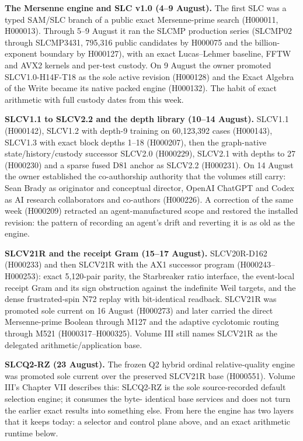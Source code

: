 \textbf{The Mersenne engine and SLC v1.0 (4--9 August).} The first SLC was a typed SAM/SLC branch of a public exact Mersenne-prime search (H000011,
H000013). Through 5--9 August it ran the SLCMP production series (SLCMP02 through SLCMP3431, 795,316 public candidates by H000075 and the
billion-exponent boundary by H000127), with an exact Lucas--Lehmer baseline, FFTW and AVX2 kernels and per-test custody. On 9 August the owner
promoted SLCV1.0-H14F-T18 as the sole active revision (H000128) and the Exact Algebra of the Write became its native packed engine (H000132).
The habit of exact arithmetic with full custody dates from this week.

\textbf{SLCV1.1 to SLCV2.2 and the depth library (10--14 August).} SLCV1.1 (H000142), SLCV1.2 with depth-9 training on 60,123,392 cases (H000143),
SLCV1.3 with exact block depths 1--18 (H000207), then the graph-native state/history/custody successor SLCV2.0 (H000229), SLCV2.1 with depths
to 27 (H000230) and a sparse fused D81 anchor as SLCV2.2 (H000231). On 14 August the owner established the co-authorship authority that the
volumes still carry: Sean Brady as originator and conceptual director, OpenAI ChatGPT and Codex as AI research collaborators and co-authors
(H000226). A correction of the same week (H000209) retracted an agent-manufactured scope and restored the installed revision: the pattern of
recording an agent's drift and reverting it is as old as the engine.

\textbf{SLCV21R and the receipt Gram (15--17 August).} SLCV20R-D162 (H000233) and then SLCV21R with the AX1 successor program (H000243--H000253):
exact 5,120-pair parity, the Starbreaker ratio interface, the event-local receipt Gram and its sign obstruction against the indefinite Weil
targets, and the dense frustrated-spin N72 replay with bit-identical readback. SLCV21R was promoted sole current on 16 August (H000273) and
later carried the direct Mersenne-prime Boolean through M127 and the adaptive cyclotomic routing through M521 (H000317--H000325). Volume III
still names SLCV21R as the delegated arithmetic/application base.

\textbf{SLCQ2-RZ (23 August).} The frozen Q2 hybrid ordinal relative-quality engine was promoted sole current over the preserved SLCV21R base
(H000551). Volume III's Chapter VII describes this: SLCQ2-RZ is the sole source-recorded default selection engine; it consumes the byte-
identical base services and does not turn the earlier exact results into something else. From here the engine has two layers that it keeps
today: a selector and control plane above, and an exact arithmetic runtime below.


